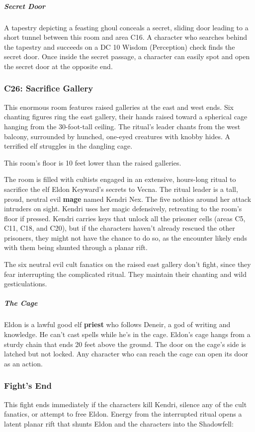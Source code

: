 \documentclass[10pt,a4paper,twoside,bg=print,twocolumn,openany,nodeprecatedcode]{dndbook}
\begin{document}
\subparagraph{Secret Door}
A tapestry depicting a feasting ghoul conceals a secret, sliding door leading to a short tunnel between this room and area C16. A character who searches behind the tapestry and succeeds on a DC 10 Wisdom (Perception) check finds the secret door. Once inside the secret passage, a character can easily spot and open the secret door at the opposite end.

\subsubsection{C26: Sacrifice Gallery}
\begin{DndReadAloud}{}
This enormous room features raised galleries at the east and west ends. Six chanting figures ring the east gallery, their hands raised toward a spherical cage hanging from the 30-foot-tall ceiling. The ritual's leader chants from the west balcony, surrounded by hunched, one-eyed creatures with knobby hides. A terrified elf struggles in the dangling cage.

\end{DndReadAloud}

This room's floor is 10 feet lower than the raised galleries.

The room is filled with cultists engaged in an extensive, hours-long ritual to sacrifice the elf Eldon Keyward's secrets to Vecna. The ritual leader is a tall, proud, neutral evil \textbf{mage} named Kendri Nex. The five nothics around her attack intruders on sight. Kendri uses her magic defensively, retreating to the room's floor if pressed. Kendri carries keys that unlock all the prisoner cells (areas C5, C11, C18, and C20), but if the characters haven't already rescued the other prisoners, they might not have the chance to do so, as the encounter likely ends with them being shunted through a planar rift.

The six neutral evil cult fanatics on the raised east gallery don't fight, since they fear interrupting the complicated ritual. They maintain their chanting and wild gesticulations.

\subparagraph{The Cage}
Eldon is a lawful good elf \textbf{priest} who follows Deneir, a god of writing and knowledge. He can't cast spells while he's in the cage. Eldon's cage hangs from a sturdy chain that ends 20 feet above the ground. The door on the cage's side is latched but not locked. Any character who can reach the cage can open its door as an action.

\subsubsection{Fight's End}
This fight ends immediately if the characters kill Kendri, silence any of the cult fanatics, or attempt to free Eldon. Energy from the interrupted ritual opens a latent planar rift that shunts Eldon and the characters into the Shadowfell:
\end{document}
